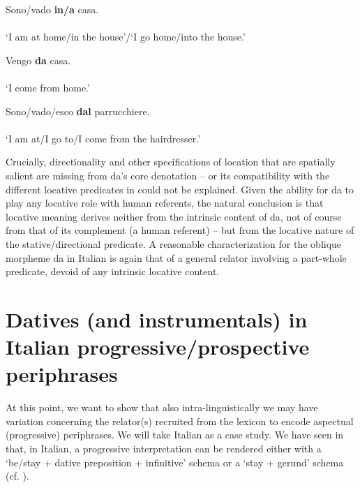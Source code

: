 \documentclass[output=paper,modfonts,nonflat,newtxmath,colorlinks,citecolor=brown]{langsci/langscibook}
\begin{document}
\ea%
    \label{ex:franco:20}
    \ea \label{ex:franco:20a}
    \gll Sono/vado   \textbf{in/a}   casa.\\
        \\
    \glt ‘I am at home/in the house’/‘I go home/into the house.’ 
    
     \ex \label{ex:franco:20b}
    \gll Vengo \textbf{da}   casa.\\
        \\
    \glt ‘I come from home.’
    
    \ex \label{ex:franco:20c}
    \gll Sono/vado/esco \textbf{dal} parrucchiere.\\
        \\
    \glt ‘I am at/I go to/I come from the hairdresser.’
    \z
    \z


Crucially, directionality and other specifications of location that are spatially salient are missing from {da}’s core denotation – or its compatibility with the different locative predicates in  could not be explained. Given the ability for {da} to play any locative role with human referents, the natural conclusion is that locative meaning derives neither from the intrinsic content of {da}, not of course from that of its complement (a human referent) – but from the locative nature of the stative/directional predicate. A reasonable characterization for the oblique morpheme {da} in Italian is again that of a general relator involving a part-whole predicate, devoid of any intrinsic locative content.
 
\section{Datives (and instrumentals) in Italian progressive/prospective periphrases}
\label{sec:franco:3}

At this point, we want to show that also intra-linguistically we may have variation concerning the relator(s) recruited from the lexicon to encode aspectual (progressive) periphrases. We will take Italian as a case study. We have seen in  that, in Italian, a progressive interpretation can be rendered either with a ‘be/stay + dative preposition + infinitive’ schema  or a ‘stay + gerund’  schema (cf. \citealt{Bertinetto2000}). 
\end{document}
